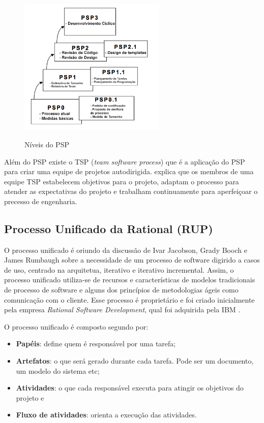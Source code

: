 \begin{figure}[htb!]
\begin{center}
\caption{Níveis do PSP}
\label{fig:09}
\includegraphics[width=7cm]{assets/psp-nivel} \\
\end{center}
\end{figure}

Além do PSP existe o TSP (\textit{team software process}) que é a aplicação do PSP para criar uma equipe de projetos autodirigida.  explica que os membros de uma equipe TSP estabelecem objetivos para o projeto, adaptam o processo para atender as expectativas do projeto e trabalham continuamente para aperfeiçoar o precesso de engenharia.

\subsection{Processo Unificado da Rational (RUP)}
\label{sec:rup}

O processo unificado é oriundo da discussão de Ivar Jacobson, Grady Booch e James Rumbaugh sobre a necessidade de um processo de software digirido a casos de uso, centrado na arquitetua, iterativo e iterativo incremental. Assim, o processo unificado utiliza-se de recursos e características de modelos tradicionais de processo de software e alguns dos princípios de metodologias ágeis como comunicação com o cliente. Esse processo é proprietário e foi criado inicialmente pela empresa \textit{Rational Software Development}, qual foi adquirida pela IBM \cite{pressman:11} \cite{machado:13}. 

O processo unificado é composto segundo  por:

\begin{itemize}
	\item \textbf{Papéis}: define quem é responsável por uma tarefa;
	\item \textbf{Artefatos}: o que será gerado durante cada tarefa. Pode ser um documento, um modelo do sistema etc;
	\item \textbf{Atividades}: o que cada responsável executa para atingir os objetivos do projeto e
	\item \textbf{Fluxo de atividades}: orienta a execução das atividades.
\end{itemize}

